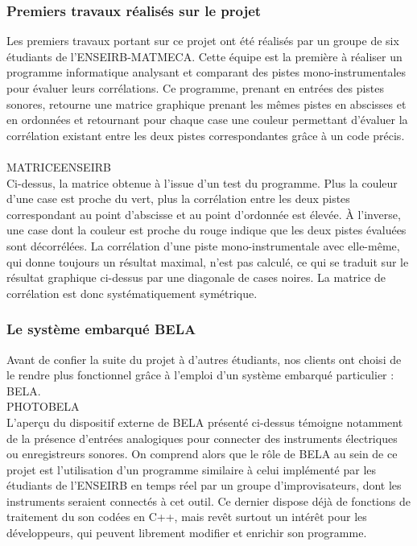 \subsubsection{Premiers travaux réalisés sur le projet}
Les premiers travaux portant sur ce projet ont été réalisés par un
groupe de six étudiants de l'ENSEIRB-MATMECA. Cette équipe est la
première à réaliser un programme informatique analysant et comparant
des pistes mono-instrumentales pour évaluer leurs corrélations. Ce
programme, prenant en entrées des pistes sonores, retourne une matrice
graphique prenant les mêmes pistes en abscisses et en ordonnées et
retournant pour chaque case une couleur permettant d'évaluer la
corrélation existant entre les deux pistes correspondantes grâce à un
code précis. \\
\\
MATRICEENSEIRB
\\
Ci-dessus, la matrice obtenue à l'issue d'un test du programme. Plus
la couleur d'une case est proche du vert, plus la corrélation entre
les deux pistes correspondant au point d'abscisse et au point
d'ordonnée est élevée. À l'inverse, une case dont la couleur est
proche du rouge indique que les deux pistes évaluées sont
décorrélées. La corrélation d'une piste mono-instrumentale avec
elle-même, qui donne toujours un résultat maximal, n'est pas calculé,
ce qui se traduit sur le résultat graphique ci-dessus par une
diagonale de cases noires. La matrice de corrélation est donc
systématiquement symétrique.

\subsubsection{Le système embarqué BELA}
Avant de confier la suite du projet à d'autres étudiants, nos clients
ont choisi de le rendre plus fonctionnel grâce à l'emploi d'un système
embarqué particulier : BELA. \\
PHOTOBELA \\
L'aperçu du dispositif externe de BELA présenté ci-dessus témoigne
notamment de la présence d'entrées analogiques pour connecter des
instruments électriques ou enregistreurs sonores. On comprend alors
que le rôle de BELA au sein de ce projet est l'utilisation d'un
programme similaire à celui implémenté par les étudiants de l'ENSEIRB
en temps réel par un groupe d'improvisateurs, dont les instruments
seraient connectés à cet outil. Ce dernier dispose déjà de fonctions
de traitement du son codées en C++, mais revêt surtout un intérêt pour
les développeurs, qui peuvent librement modifier et enrichir son
programme.

